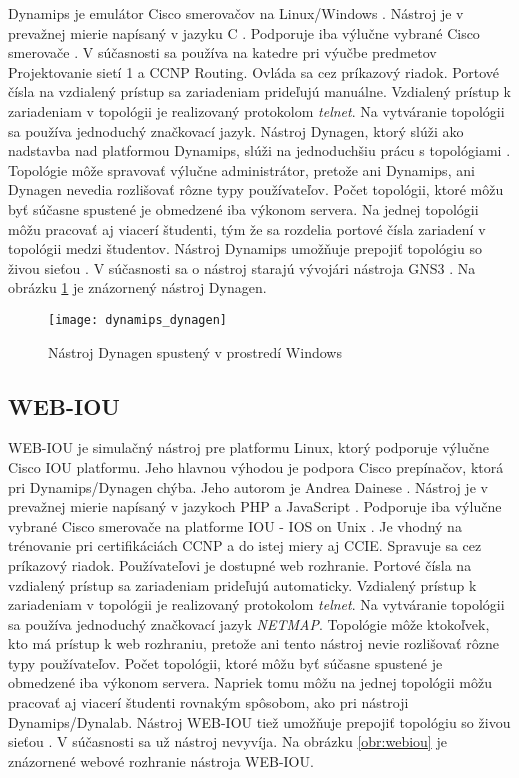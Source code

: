 Dynamips je emulátor Cisco smerovačov na Linux/Windows \cite{dynamips}. Nástroj je v prevažnej mierie napísaný v jazyku C \cite{dynamips_github}. Podporuje iba výlučne vybrané Cisco smerovače \cite{dynamips}. V súčasnosti sa používa na katedre pri výučbe predmetov Projektovanie sietí 1 a CCNP Routing. Ovláda sa cez príkazový riadok. Portové čísla na vzdialený prístup sa zariadeniam prideľujú manuálne. Vzdialený prístup k zariadeniam v topológii je realizovaný protokolom \emph{telnet}. Na vytváranie topológii sa používa jednoduchý značkovací jazyk. Nástroj Dynagen, ktorý slúži ako nadstavba nad platformou Dynamips, slúži na jednoduchšiu prácu s topológiami \cite{dynamips}. Topológie môže spravovať výlučne administrátor, pretože ani Dynamips, ani Dynagen nevedia rozlišovať rôzne typy používateľov. Počet topológii, ktoré môžu byť súčasne spustené je obmedzené iba výkonom servera. Na jednej topológii môžu pracovať aj viacerí študenti, tým že sa rozdelia portové čísla zariadení v topológii medzi študentov. Nástroj Dynamips umožňuje prepojiť topológiu so živou sieťou \cite{dynamips, dynamips_nil}. V súčasnosti sa o nástroj starajú vývojári nástroja GNS3 \cite{dynamips_github}. Na obrázku \ref{obr:dynamips_dynagen} je znázornený nástroj Dynagen.

\begin{figure}
    \centering
    \texttt{[image: dynamips\_dynagen]}
    \caption{Nástroj Dynagen spustený v prostredí Windows} \cite{obr_dynamips_dynagen}
    \label{obr:dynamips_dynagen}
\end{figure}

\subsection{WEB-IOU}

WEB-IOU je simulačný nástroj pre platformu Linux, ktorý podporuje výlučne Cisco IOU platformu. Jeho hlavnou výhodou je podpora Cisco prepínačov, ktorá pri Dynamips/Dynagen chýba. Jeho autorom je Andrea Dainese \cite{webiou_unetlab}. Nástroj je v prevažnej mierie napísaný v jazykoch PHP a JavaScript \cite{webiou_github}. Podporuje iba výlučne vybrané Cisco smerovače na platforme IOU - IOS on Unix \cite{webiou_firewall_cx}. Je vhodný na trénovanie pri certifikáciách CCNP a do istej miery aj CCIE. Spravuje sa cez príkazový riadok. Používateľovi je dostupné web rozhranie. Portové čísla na vzdialený prístup sa zariadeniam prideľujú automaticky. Vzdialený prístup k zariadeniam v topológii je realizovaný protokolom \emph{telnet}. Na vytváranie topológii sa používa jednoduchý značkovací jazyk \emph{NETMAP}. Topológie môže ktokoľvek, kto má prístup k web rozhraniu, pretože ani tento nástroj nevie rozlišovať rôzne typy používateľov. Počet topológii, ktoré môžu byť súčasne spustené je obmedzené iba výkonom servera. Napriek tomu môžu na jednej topológii môžu pracovať aj viacerí študenti rovnakým spôsobom, ako pri nástroji Dynamips/Dynalab. Nástroj WEB-IOU tiež umožňuje prepojiť topológiu so živou sieťou \cite{webiou_real_network}. V súčasnosti sa už nástroj nevyvíja. Na obrázku \ref{obr:webiou} je znázornené webové rozhranie nástroja WEB-IOU.

